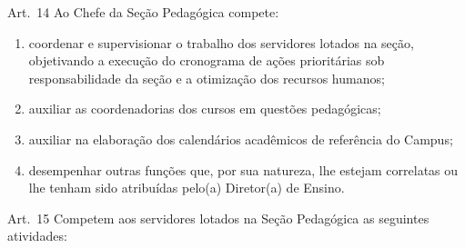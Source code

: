 \documentclass[a4paper,12pt]{report}
\begin{document}
Art.~14 Ao Chefe da Seção Pedagógica compete:

\begin{enumerate}
\renewcommand{\labelenumi}{\Roman{enumi}}

\item coordenar e supervisionar o trabalho dos servidores lotados na seção, objetivando a 
      execução do cronograma de ações prioritárias sob responsabilidade da seção e a 
      otimização dos recursos humanos;

\item auxiliar as coordenadorias dos cursos em questões pedagógicas;

\item auxiliar na elaboração dos calendários acadêmicos de referência do Campus;

\item desempenhar outras funções que, por sua natureza, lhe estejam correlatas ou lhe 
      tenham sido atribuídas pelo(a) Diretor(a) de Ensino.
\end{enumerate}


Art.~15 Competem aos servidores lotados na Seção Pedagógica as seguintes atividades:
\end{document}
